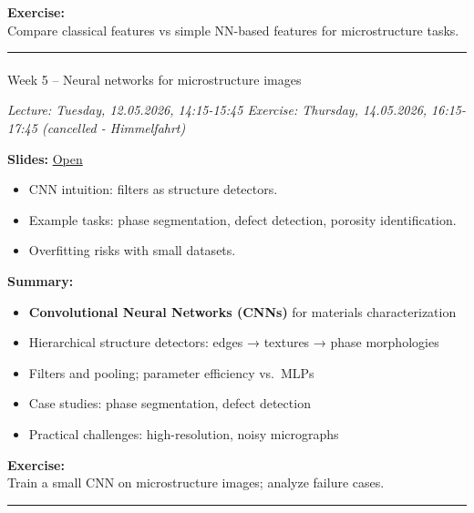 \documentclass[
]{agujournal2019}
\makeatletter
\let\oldparagraph\paragraph
\renewcommand{\paragraph}{
    \@ifstar
      \xxxParagraphStar
      \xxxParagraphNoStar
  }
\newcommand{\xxxParagraphStar}[1]{\oldparagraph*{#1}\mbox{}}
\newcommand{\xxxParagraphNoStar}[1]{\oldparagraph{#1}\mbox{}}
\providecommand{\tightlist}{%
  \setlength{\itemsep}{0pt}\setlength{\parskip}{0pt}}
\makeatother
\begin{document}
\textbf{Exercise:}\\
Compare classical features vs simple NN-based features for
microstructure tasks.

\begin{center}\rule{0.5\linewidth}{0.5pt}\end{center}

\paragraph{Week 5 -- Neural networks for microstructure
images}\label{week-5-neural-networks-for-microstructure-images}

\emph{Lecture: Tuesday, 12.05.2026, 14:15-15:45 \textbar{} Exercise:
Thursday, 14.05.2026, 16:15-17:45 (cancelled - Himmelfahrt)}

\textbf{Slides:}
\href{https://pelzlab.science/public_presentations/ml_for_characterization_and_processing/unit05_unsupervised_learning/01_intro.html}{Open}

\begin{itemize}
\tightlist
\item
  CNN intuition: filters as structure detectors.
\item
  Example tasks: phase segmentation, defect detection, porosity
  identification.
\item
  Overfitting risks with small datasets.
\end{itemize}

\textbf{Summary:}

\begin{itemize}
\tightlist
\item
  \textbf{Convolutional Neural Networks (CNNs)} for materials
  characterization
\item
  Hierarchical structure detectors: edges → textures → phase
  morphologies
\item
  Filters and pooling; parameter efficiency vs.~MLPs
\item
  Case studies: phase segmentation, defect detection
\item
  Practical challenges: high-resolution, noisy micrographs
\end{itemize}

\textbf{Exercise:}\\
Train a small CNN on microstructure images; analyze failure cases.

\begin{center}\rule{0.5\linewidth}{0.5pt}\end{center}
\end{document}
